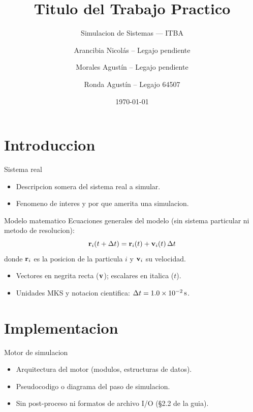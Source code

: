 \documentclass[aspectratio=169]{beamer}
\title{Titulo del Trabajo Practico}
\subtitle{Simulacion de Sistemas --- ITBA}
\author[Grupo 2]{Arancibia Nicolás -- Legajo pendiente \and
  Morales Agustín -- Legajo pendiente \and Ronda Agustín -- Legajo 64507}
\institute[ITBA]{Grupo 2 --- Comisión S2 --- Instituto Tecnologico de Buenos Aires}
\date{\today}
\begin{document}
\begin{frame}[plain]
  \titlepage
\end{frame}

\section{Introduccion}
\begin{frame}{Sistema real}
  \begin{itemize}
    \item Descripcion somera del sistema real a simular.
    \item Fenomeno de interes y por que amerita una simulacion.
  \end{itemize}
\end{frame}

\begin{frame}{Modelo matematico}
  Ecuaciones generales del modelo (sin sistema particular ni metodo de resolucion):
  \begin{equation}
    \mathbf{r}_i(t+\Delta t) = \mathbf{r}_i(t) + \mathbf{v}_i(t)\,\Delta t
  \end{equation}
  donde $\mathbf{r}_i$ es la posicion de la particula $i$ y $\mathbf{v}_i$ su velocidad.
  \begin{itemize}
    \item Vectores en negrita recta ($\mathbf{v}$); escalares en italica ($t$).
    \item Unidades MKS y notacion cientifica: $\Delta t = 1.0\times 10^{-2}\,\mathrm{s}$.
  \end{itemize}
\end{frame}

\section{Implementacion}
\begin{frame}{Motor de simulacion}
  \begin{itemize}
    \item Arquitectura del motor (modulos, estructuras de datos).
    \item Pseudocodigo o diagrama del paso de simulacion.
    \item Sin post-proceso ni formatos de archivo I/O (§2.2 de la guia).
  \end{itemize}
\end{frame}
\end{document}
